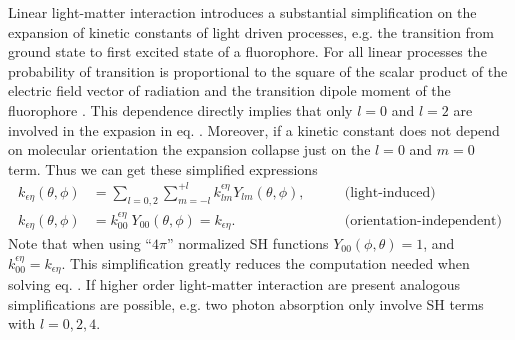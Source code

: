 \documentclass{article}
\begin{document}
Linear light-matter interaction introduces a substantial simplification on the expansion of kinetic constants of light driven processes, e.g. the transition from ground state to first excited state of a fluorophore. For all linear processes the probability of transition is proportional to the square of the scalar product of the electric field vector of radiation and the transition dipole moment of the fluorophore \cite{LakowiczBook}. This dependence directly implies that only $l=0$ and $l=2$ are involved in the expasion in eq. . Moreover, if a kinetic constant does not depend on molecular orientation the expansion collapse just on the $l=0$ and $m=0$ term. Thus we can get these simplified expressions
\begin{equation}
\begin{aligned}
    k_{\epsilon\eta}(\theta,\phi) &= \sum_{l=0,2} \sum_{m=-l}^{+l} k^{\epsilon\eta}_{lm} Y_{lm}(\theta,\phi), \qquad &\text{(light-induced)} \\
    k_{\epsilon\eta}(\theta,\phi) &= k_{00}^{\epsilon\eta} \ Y_{00}(\theta,\phi) = k_{\epsilon\eta}. \qquad &\text{(orientation-independent)}
\end{aligned}
\end{equation}
Note that when using ``$4\pi$'' normalized SH functions $Y_{00}(\phi,\theta)=1$, and $k_{00}^{\epsilon\eta}=k_{\epsilon\eta}$.
This simplification greatly reduces the computation needed when solving eq. . If higher order light-matter interaction are present analogous simplifications are possible, e.g. two photon absorption only involve SH terms with $l=0,2,4$.

\end{document}
